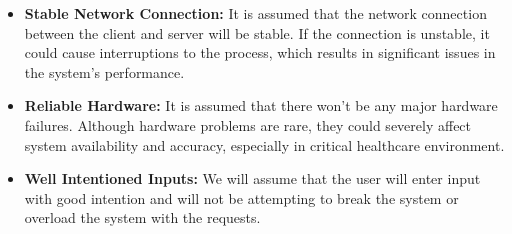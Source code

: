 \documentclass{article}
\begin{document}
\begin{itemize}
    \item \textbf{Stable Network Connection:} It is assumed that the network connection between the client and server will be stable. If the connection is unstable, it could cause interruptions to the process, which results in significant issues in the system’s performance.
        
    \item \textbf{Reliable Hardware:} It is assumed that there won’t be any major hardware failures. Although hardware problems are rare, they could severely affect system availability and accuracy, especially in critical healthcare environment.

    \item \textbf{Well Intentioned Inputs: } We will assume that the user will enter input with good intention and will not be attempting to break the system or overload the system with the requests. 
\end{itemize}
\end{document}
